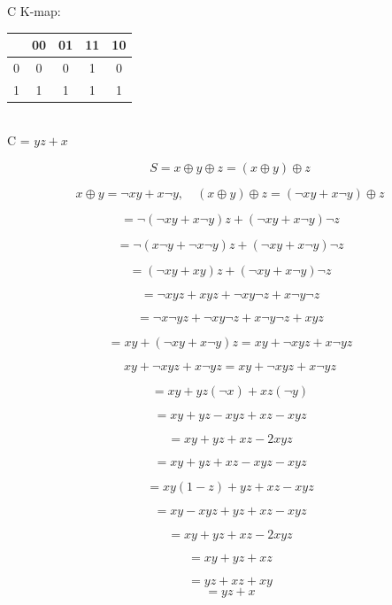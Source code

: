 \documentclass{article}
\begin{document}
 {
    C K-map: \\
    \linebreak
    \begin{tabular}{|c|c|c|c|c|}
        \hline
          & 00 & 01 & 11 & 10 \\
        \hline
        0 & 0  & 0  & 1  & 0  \\
        \hline
        1 & 1  & 1  & 1  & 1  \\
        \hline
    \end{tabular} \\
    \linebreak
    C = $yz + x$
}

 {
    \[
        S = x \oplus y \oplus z = (x \oplus y) \oplus z
    \]

    \[
        x \oplus y = \neg x y + x \neg y, \quad (x \oplus y) \oplus z = (\neg x y + x \neg y) \oplus z
    \]

    \[
        = \neg (\neg x y + x \neg y) z + (\neg x y + x \neg y) \neg z
    \]

    \[
        = \neg (x \neg y + \neg x \neg y) z + (\neg x y + x \neg y) \neg z
    \]

    \[
        = (\neg x y + x y) z + (\neg x y + x \neg y) \neg z
    \]

    \[
        = \neg x y z + x y z + \neg x y \neg z + x \neg y \neg z
    \]

    \[
        = \neg x \neg y z + \neg x y \neg z + x \neg y \neg z + x y z
    \]
}

 {
    \[
        = xy + (\neg x y + x \neg y)z = xy + \neg x y z + x \neg y z
    \]

    \[
        xy + \neg x y z + x \neg y z = xy + \neg x y z + x \neg y z
    \]

    \[
        = xy + yz (\neg x) + xz (\neg y)
    \]

    \[
        = xy + yz - xy z + xz - xy z
    \]

    \[
        = xy + yz + xz - 2xy z
    \]

    \[
        = xy + yz + xz - xy z - xy z
    \]

    \[
        = xy(1 - z) + yz + xz - xy z
    \]

    \[
        = xy - xy z + yz + xz - xy z
    \]

    \[
        = xy + yz + xz - 2xy z
    \]

    \[
        = xy + yz + xz
    \]

    \[
        = yz + xz + xy
    \]
    \[
        = yz + x
    \]
}
\end{document}
